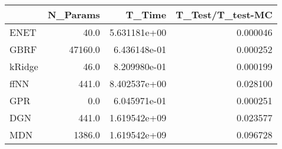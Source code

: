\begin{tabular}{lrrr}
\toprule
{} &  N\_Params &        T\_Time &  T\_Test/T\_test-MC \\
\midrule
ENET   &      40.0 &  5.631181e+00 &          0.000046 \\
GBRF   &   47160.0 &  6.436148e-01 &          0.000252 \\
kRidge &      46.0 &  8.209980e-01 &          0.000199 \\
ffNN   &     441.0 &  8.402537e+00 &          0.028100 \\
GPR    &       0.0 &  6.045971e-01 &          0.000251 \\
DGN    &     441.0 &  1.619542e+09 &          0.023577 \\
MDN    &    1386.0 &  1.619542e+09 &          0.096728 \\
\bottomrule
\end{tabular}

